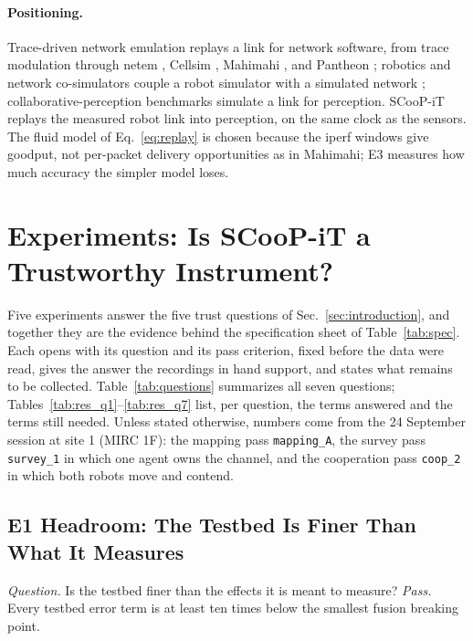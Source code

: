 \documentclass[journal]{IEEEtran}
\begin{document}
\paragraph{Positioning.} Trace-driven network emulation replays a link
for network software, from trace modulation \cite{noble1997trace}
through netem \cite{hemminger2005netem}, Cellsim
\cite{winstein2013sprout}, Mahimahi \cite{netravali2015mahimahi}, and
Pantheon \cite{yan2018pantheon}; robotics and network co-simulators
couple a robot simulator with a simulated network
\cite{calvofullana2021rosnetsim,sommer2011veins,xu2021opencda};
collaborative-perception benchmarks simulate a link for perception.
SCooP-iT replays the measured robot link into perception, on the same
clock as the sensors. The fluid model of Eq.~\eqref{eq:replay} is
chosen because the iperf windows give goodput, not per-packet delivery
opportunities as in Mahimahi; E3 measures how much accuracy the simpler
model loses.



\section{Experiments: Is SCooP-iT a Trustworthy Instrument?}
\label{sec:experiments}
Five experiments answer the five trust questions of
Sec.~\ref{sec:introduction}, and together they are the evidence
behind the specification sheet of Table~\ref{tab:spec}. Each opens
with its question and its pass criterion, fixed before the data were
read, gives the answer the recordings in hand support, and states what
remains to be collected. Table~\ref{tab:questions} summarizes all
seven questions; Tables~\ref{tab:res_q1}--\ref{tab:res_q7} list, per
question, the terms answered and the terms still needed. Unless stated otherwise, numbers come from the
24 September session at site 1 (MIRC 1F): the mapping pass
\texttt{mapping\_A}, the survey pass \texttt{survey\_1} in which
one agent owns the channel, and the cooperation pass \texttt{coop\_2}
in which both robots move and contend.





\subsection{E1 Headroom: The Testbed Is Finer Than What It Measures}
\emph{Question.} Is the testbed finer than the effects it is meant to
measure? \emph{Pass.} Every testbed error term is at least ten times
below the smallest fusion breaking point.
\end{document}
